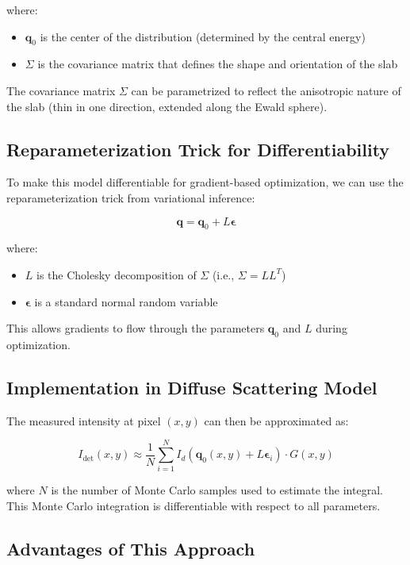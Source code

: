 \documentclass[12pt,a4paper]{article}
\begin{document}
where:
\begin{itemize}
\item $\mathbf{q}_0$ is the center of the distribution (determined by the central energy)
\item $\Sigma$ is the covariance matrix that defines the shape and orientation of the slab
\end{itemize}

The covariance matrix $\Sigma$ can be parametrized to reflect the anisotropic nature of the slab (thin in one direction, extended along the Ewald sphere).

\subsection{Reparameterization Trick for Differentiability}

To make this model differentiable for gradient-based optimization, we can use the reparameterization trick from variational inference:

\begin{equation}
\mathbf{q} = \mathbf{q}_0 + L\mathbf{\epsilon}
\end{equation}

where:
\begin{itemize}
\item $L$ is the Cholesky decomposition of $\Sigma$ (i.e., $\Sigma = LL^T$)
\item $\mathbf{\epsilon}$ is a standard normal random variable
\end{itemize}

This allows gradients to flow through the parameters $\mathbf{q}_0$ and $L$ during optimization.

\subsection{Implementation in Diffuse Scattering Model}

The measured intensity at pixel $(x,y)$ can then be approximated as:

\begin{equation}
I_{\text{det}}(x,y) \approx \frac{1}{N} \sum_{i=1}^{N} I_d(\mathbf{q}_0(x,y) + L\mathbf{\epsilon}_i) \cdot G(x,y)
\end{equation}

where $N$ is the number of Monte Carlo samples used to estimate the integral. This Monte Carlo integration is differentiable with respect to all parameters.

\subsection{Advantages of This Approach}
\end{document}
